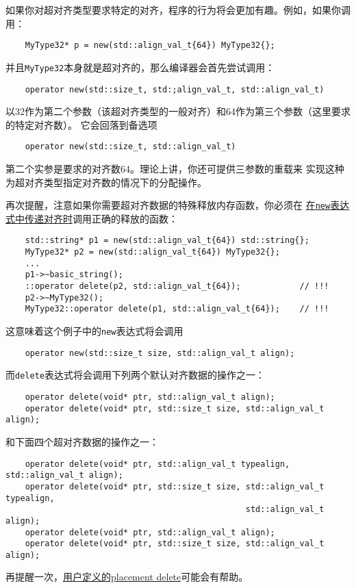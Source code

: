 如果你对超对齐类型要求特定的对齐，程序的行为将会更加有趣。例如，如果你调用：
\begin{lstlisting}
    MyType32* p = new(std::align_val_t{64}) MyType32{};
\end{lstlisting}
并且\texttt{MyType32}本身就是超对齐的，那么编译器会首先尝试调用：
\begin{lstlisting}
    operator new(std::size_t, std:;align_val_t, std::align_val_t)
\end{lstlisting}
以32作为第二个参数（该超对齐类型的一般对齐）和64作为第三个参数（这里要求的特定对齐数）。
它会回落到备选项
\begin{lstlisting}
    operator new(std::size_t, std::align_val_t)
\end{lstlisting}
第二个实参是要求的对齐数64。理论上讲，你还可提供三参数的重载来
实现这种为超对齐类型指定对齐数的情况下的分配操作。

再次提醒，注意如果你需要超对齐数据的特殊释放内存函数，你必须在
\hyperref[ch30.1.2]{在\texttt{new}表达式中传递对齐时}调用正确的释放的函数：\label{类型特定delete}
\begin{lstlisting}
    std::string* p1 = new(std::align_val_t{64}) std::string{};
    MyType32* p2 = new(std::align_val_t{64}) MyType32{};
    ...
    p1->~basic_string();
    ::operator delete(p2, std::align_val_t{64});            // !!!
    p2->~MyType32();
    MyType32::operator delete(p1, std::align_val_t{64});    // !!!
\end{lstlisting}
这意味着这个例子中的\texttt{new}表达式将会调用
\begin{lstlisting}
    operator new(std::size_t size, std::align_val_t align);
\end{lstlisting}
而\texttt{delete}表达式将会调用下列两个默认对齐数据的操作之一：
\begin{lstlisting}
    operator delete(void* ptr, std::align_val_t align);
    operator delete(void* ptr, std::size_t size, std::align_val_t align);
\end{lstlisting}
和下面四个超对齐数据的操作之一：
\begin{lstlisting}
    operator delete(void* ptr, std::align_val_t typealign, std::align_val_t align);
    operator delete(void* ptr, std::size_t size, std::align_val_t typealign,
                                                 std::align_val_t align);
    operator delete(void* ptr, std::align_val_t align);
    operator delete(void* ptr, std::size_t size, std::align_val_t align);
\end{lstlisting}
再提醒一次，\hyperref[ch30.1.2.2]{用户定义的placement delete}可能会有帮助。



